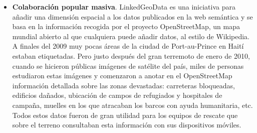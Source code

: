 \begin{itemize}
	\item %
	
	\textbf{Colaboración popular masiva}. LinkedGeoData es una iniciativa para añadir una dimensión espacial a los datos publicados en la web semántica y se basa en la información recogida por el proyecto OpenStreetMap, un mapa mundial abierto al que cualquiera puede añadir datos, al estilo de Wikipedia. A finales del 2009 muy pocas áreas de la ciudad de Port-au-Prince en Haití estaban etiquetadas. Pero justo después del gran terremoto de enero de 2010, cuando se hicieron públicas imágenes de satélite del país, miles de personas estudiaron estas imágenes y comenzaron a anotar en el OpenStreetMap información detallada sobre las zonas devastadas: carreteras bloqueadas, edificios dañados, ubicación de campos de refugiados y hospitales de campaña, muelles en los que atracaban los barcos con ayuda humanitaria, etc. Todos estos datos fueron de gran utilidad para los equipos de rescate que sobre el terreno consultaban esta información con sus dispositivos móviles.
	
\end{itemize}




